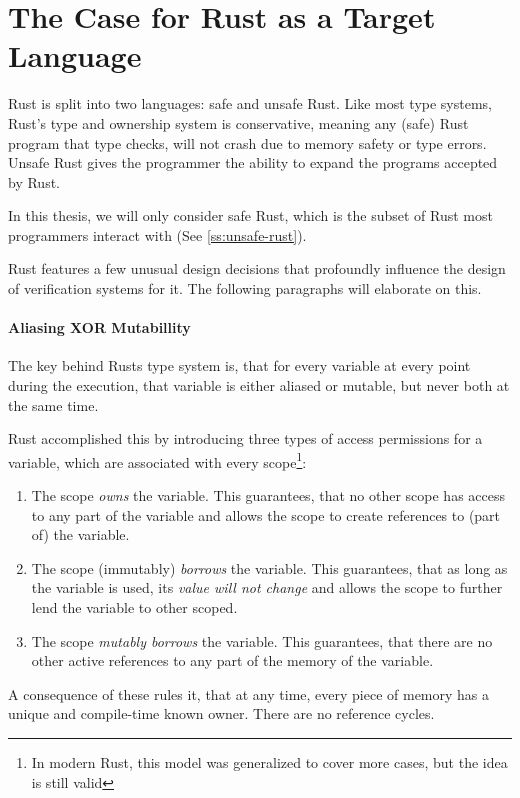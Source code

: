 \documentclass{article}
\begin{document}
\tableofcontents

\section{The Case for Rust as a Target Language}

Rust is split into two languages: safe and unsafe Rust. Like most type systems, Rust's type and ownership system is conservative, meaning any (safe) Rust program that type checks, will not crash due to memory safety or type errors. Unsafe Rust gives the programmer the ability to expand the programs accepted by Rust. 

In this thesis, we will only consider safe Rust, which is the subset of Rust most programmers interact with (See \ref{ss:unsafe-rust}).

Rust features a few unusual design decisions that profoundly influence the design of verification systems for it. The following paragraphs will elaborate on this.

\paragraph{Aliasing XOR Mutabillity} The key behind Rusts type system is, that for every variable at every point during the execution, that variable is either aliased or mutable, but never both at the same time. 

Rust accomplished this by introducing three types of access permissions for a variable, which are associated with every scope\footnote{In modern Rust, this model was generalized to cover more cases, but the idea is still valid}:
\begin{enumerate}
  \item The scope \textit{owns} the variable. This guarantees, that no other scope has access to any part of the variable and allows the scope to create references to (part of) the variable. 
  \item The scope (immutably) \textit{borrows} the variable. This guarantees, that as long as the variable is used, its \textit{value will not change} and allows the scope to further lend the variable to other scoped.
  \item The scope \textit{mutably borrows} the variable. This guarantees, that there are no other active references to any part of the memory of the variable. 
\end{enumerate}

A consequence of these rules it, that at any time, every piece of memory has a unique and compile-time known owner. There are no reference cycles.
\end{document}

